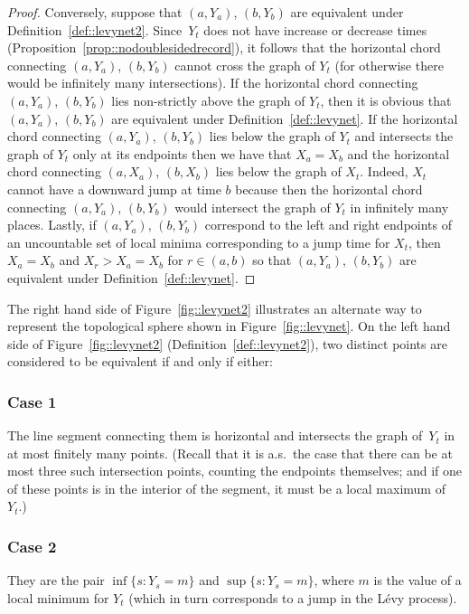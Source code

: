 \documentclass[JEP,XML,SOM,Unicode]{cedram}
\theoremstyle{plain}
\numberwithin{theorem}{section}
\theoremstyle{definition}
\begin{document}
\begin{proof}
Conversely, suppose that $(a,Y_a)$, $(b,Y_b)$ are equivalent under Definition~\ref{def::levynet2}. Since~$Y_t$ does not have increase or decrease times (Proposition~\ref{prop::nodoublesidedrecord}), it follows that the horizontal chord connecting $(a,Y_a)$, $(b,Y_b)$ cannot cross the graph of $Y_t$ (for otherwise there would be infinitely many intersections). If the horizontal chord connecting $(a,Y_a)$, $(b,Y_b)$ lies non-strictly above the graph of $Y_t$, then it is obvious that $(a,Y_a)$, $(b,Y_b)$ are equivalent under Definition~\ref{def::levynet}. If the horizontal chord connecting $(a,Y_a)$, $(b,Y_b)$ lies below the graph of $Y_t$ and intersects the graph of $Y_t$ only at its endpoints then we have that $X_a = X_b$ and the horizontal chord connecting $(a,X_a)$, $(b,X_b)$ lies below the graph of $X_t$. Indeed, $X_t$ cannot have a downward jump at time $b$ because then the horizontal chord connecting $(a,Y_a)$, $(b,Y_b)$ would intersect the graph of $Y_t$ in infinitely many places. Lastly, if $(a,Y_a)$, $(b,Y_b)$ correspond to the left and right endpoints of an uncountable set of local minima corresponding to a jump time for $X_t$, then $X_a = X_b$ and $X_r > X_a = X_b$ for $r \in (a,b)$ so that $(a,Y_a)$, $(b,Y_b)$ are equivalent under Definition~\ref{def::levynet}.
\end{proof}

The right hand side of Figure~\ref{fig::levynet2} illustrates an alternate way to represent the topological sphere shown in Figure~\ref{fig::levynet}. On the left hand side of Figure~\ref{fig::levynet2} (\ie Definition~\ref{def::levynet2}), two distinct points are considered to be equivalent if and only if either:

\subsubsection*{Case 1}
The line segment connecting them is horizontal and intersects the graph of~$Y_t$ in at most finitely many points. (Recall that it is a.s.\ the case that there can be at most three such intersection points, counting the endpoints themselves; and if one of these points is in the interior of the segment, it must be a local maximum of~$Y_t$.)

\subsubsection*{Case 2}
They are the pair $\inf\{s : Y_s = m\}$ and $\sup\{s : Y_s = m\}$, where $m$ is the value of a local minimum for $Y_t$ (which in turn corresponds to a jump in the Lévy process).
\end{document}
